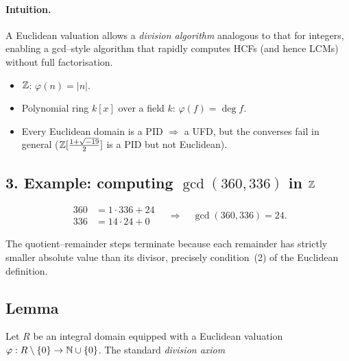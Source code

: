 \documentclass[12pt]{article}
\theoremstyle{definition} %
\theoremstyle{plain} %
\begin{document}
\paragraph{Intuition.}
A Euclidean valuation allows a \emph{division algorithm} analogous to that for
integers, enabling a gcd–style algorithm that rapidly computes HCFs (and
hence LCMs) without full factorisation.

\begin{itemize}
  \item \(\Bbb Z\): \(\varphi(n)=|n|\).
  \item Polynomial ring \(k[x]\) over a field \(k\):
        \(\varphi(f)=\deg f\).
  \item Every Euclidean domain is a PID \(\Longrightarrow\) a UFD,
        but the converses fail in general (\(\Bbb Z[\tfrac{1+\sqrt{-19}}{2}]\)
        is a PID but not Euclidean).
\end{itemize}

\bigskip
\subsection*{3.  Example: computing \(\gcd(360,336)\) in \(\Bbb Z\)}

\[
\begin{aligned}
360 &= 1\cdot336 + 24\\
336 &= 14\cdot24 + 0
\end{aligned}
\quad\Longrightarrow\quad
\gcd(360,336)=24.
\]

The quotient–remainder steps terminate because each remainder
has strictly smaller absolute value than its divisor, precisely condition~(2)
of the Euclidean definition.

\subsection*{Lemma}
Let \(R\) be an integral domain equipped with a Euclidean valuation
\(\varphi:R\setminus\{0\}\to\Bbb N\cup\{0\}\).
The standard \emph{division axiom}
\end{document}
